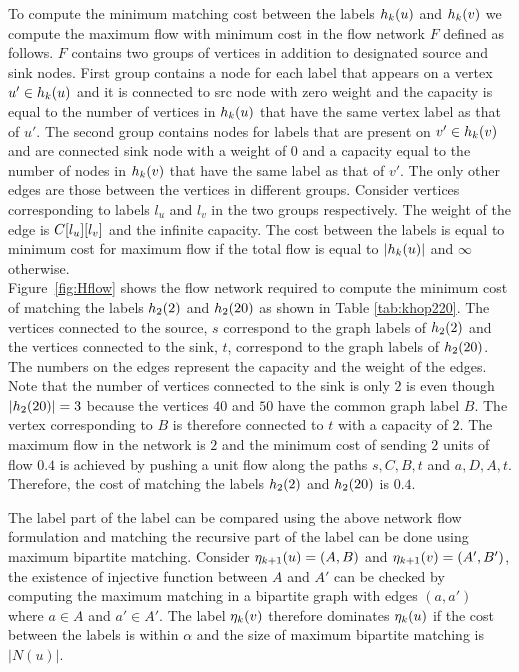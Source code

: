  To compute the minimum
matching cost between the \khop labels
$h_{k}(u)$ and $h_{k}(v)$ we compute the maximum flow with minimum
cost in the flow network $F$ defined as follows. $F$ contains two groups of
vertices in addition to designated source and sink nodes. 
First group contains a node for
each label that appears on a vertex $u' \in h_{k}(u)$ and it is connected
to src node with zero weight and the capacity is equal to the number of vertices
in $h_{k}(u)$ that have the same vertex label as that of $u'$.
The second group contains nodes
for labels that are present on $v' \in h_{k}(v)$ and are connected sink 
node with a weight of $0$ and a capacity equal to the 
number of nodes in $h_{k}(v)$ that have the same label as
that of $v'$. The only other edges are those between the
vertices in different groups. Consider vertices corresponding to labels $l_u$
and $l_v$ in the two groups respectively. The weight of the edge is ${C}[l_u][l_v]$
and the infinite capacity.
The cost between the \khop labels is equal to
minimum cost for maximum flow if the total flow is equal to $|h_{k}(u)|$ and 
$\infty$ otherwise. \\
Figure~\ref{fig:Hflow} shows the flow network required to compute the minimum
cost of matching the \khop labels $h_{2}(2)$ and $h_{2}(20)$ as shown in
Table \ref{tab:khop220}. The vertices connected to the source, $s$ correspond to
the graph labels of $h_{2}(2)$ and the vertices connected to the sink, $t$, 
correspond to the graph labels of $h_{2}(20)$. The numbers on the edges represent
the capacity and the weight of the edges.
Note that the number of vertices connected to the sink is only $2$ 
is even though $|h_{2}(20)| = 3$ because the vertices $40$ and $50$
have the common graph label $B$. The vertex corresponding to $B$ is therefore
connected to $t$ with a capacity of $2$. The maximum flow in the network
is $2$ and the minimum cost of sending $2$ units of flow $0.4$ is 
achieved by pushing a unit flow along the paths $s, C, B, t$ and $a, D, A, t$.
Therefore, the cost of matching the labels $h_{2}(2)$ and $h_{2}(20)$
is $0.4$.

 The \khop label part of the \ncl label can
be compared using the above network flow formulation and matching the recursive
part of the \ncl label can be done using maximum bipartite matching. Consider 
$\eta_{k+1}(u) = (A, B)$ and $\eta_{k+1}(v) = (A', B')$, the 
existence of injective function between $A$ and $A'$ can be checked by computing 
the maximum matching in a bipartite graph with edges $(a, a')$ where $a \in A$ and
$a' \in A'$.
The \ncl label
$\eta_{k}(v)$ therefore dominates $\eta_{k}(u)$ if the cost between the \khop labels is within
$\alpha$ and the size of maximum bipartite matching is $|N(u)|$.

